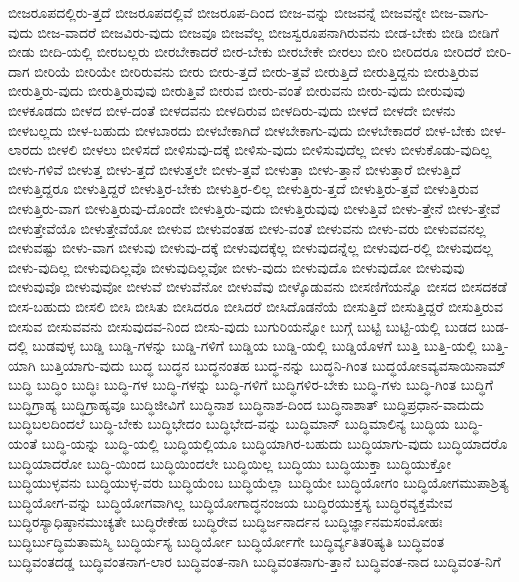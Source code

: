 {ಬೀಜರೂಪದಲ್ಲಿರು-ತ್ತದೆ
ಬೀಜರೂಪದಲ್ಲಿವೆ
ಬೀಜರೂಪ-ದಿಂದ
ಬೀಜ-ವನ್ನು
ಬೀಜವನ್ನೆ
ಬೀಜವನ್ನೇ
ಬೀಜ-ವಾಗು-ವುದು
ಬೀಜ-ವಾದರೆ
ಬೀಜವಿರು-ವುದು
ಬೀಜವೂ
ಬೀಜವೆಲ್ಲ
ಬೀಜಸ್ವರೂಪನಾಗಿರುವನು
ಬೀಡ-ಬೇಕು
ಬೀಡಿ
ಬೀಡಿಗೆ
ಬೀಡು
ಬೀದಿ-ಯಲ್ಲಿ
ಬೀರಬಲ್ಲರು
ಬೀರಬೇಕಾದರೆ
ಬೀರ-ಬೇಕು
ಬೀರಬೇಕೇ
ಬೀರಲು
ಬೀರಿ
ಬೀರಿದರೂ
ಬೀರಿದರೆ
ಬೀರಿ-ದಾಗ
ಬೀರಿಯೆ
ಬೀರಿಯೇ
ಬೀರಿರುವನು
ಬೀರು
ಬೀರು-ತ್ತದೆ
ಬೀರು-ತ್ತವೆ
ಬೀರುತ್ತಿದೆ
ಬೀರುತ್ತಿದ್ದನು
ಬೀರುತ್ತಿರುವ
ಬೀರುತ್ತಿರು-ವುದು
ಬೀರುತ್ತಿರುವುವು
ಬೀರುತ್ತಿವೆ
ಬೀರುವ
ಬೀರು-ವಂತೆ
ಬೀರುವನು
ಬೀರು-ವುದು
ಬೀರುವುವು
ಬೀಳಕೂಡದು
ಬೀಳದ
ಬೀಳ-ದಂತೆ
ಬೀಳದವನು
ಬೀಳದಿರುವ
ಬೀಳದಿರು-ವುದು
ಬೀಳದೆ
ಬೀಳದೇ
ಬೀಳನು
ಬೀಳಬಲ್ಲದು
ಬೀಳ-ಬಹುದು
ಬೀಳಬಾರದು
ಬೀಳಬೇಕಾಗಿದೆ
ಬೀಳಬೇಕಾಗು-ವುದು
ಬೀಳಬೇಕಾದರೆ
ಬೀಳ-ಬೇಕು
ಬೀಳ-ಲಾರದು
ಬೀಳಲಿ
ಬೀಳಲು
ಬೀಳಿಸದೆ
ಬೀಳಿಸುವು-ದಕ್ಕೆ
ಬೀಳಿಸು-ವುದು
ಬೀಳಿಸುವುದೆಲ್ಲ
ಬೀಳು
ಬೀಳುಕೊಡು-ವುದಿಲ್ಲ
ಬೀಳು-ಗಳಿವೆ
ಬೀಳುತ್ತ
ಬೀಳು-ತ್ತದೆ
ಬೀಳುತ್ತಲೇ
ಬೀಳು-ತ್ತವೆ
ಬೀಳುತ್ತಾ
ಬೀಳು-ತ್ತಾನೆ
ಬೀಳುತ್ತಾರೆ
ಬೀಳುತ್ತಿದೆ
ಬೀಳುತ್ತಿದ್ದರೂ
ಬೀಳುತ್ತಿದ್ದರೆ
ಬೀಳುತ್ತಿರ-ಬೇಕು
ಬೀಳುತ್ತಿರ-ಲಿಲ್ಲ
ಬೀಳುತ್ತಿರು-ತ್ತದೆ
ಬೀಳುತ್ತಿರು-ತ್ತವೆ
ಬೀಳುತ್ತಿರುವ
ಬೀಳುತ್ತಿರು-ವಾಗ
ಬೀಳುತ್ತಿರುವು-ದೊಂದೇ
ಬೀಳುತ್ತಿರು-ವುದು
ಬೀಳುತ್ತಿರುವುವು
ಬೀಳುತ್ತಿವೆ
ಬೀಳು-ತ್ತೇನೆ
ಬೀಳು-ತ್ತೇವೆ
ಬೀಳುತ್ತೇವೆಯೊ
ಬೀಳುತ್ತೇವೆಯೋ
ಬೀಳುವ
ಬೀಳುವಂತಹ
ಬೀಳು-ವಂತೆ
ಬೀಳುವನು
ಬೀಳು-ವರು
ಬೀಳುವವನಲ್ಲ
ಬೀಳುವಷ್ಟು
ಬೀಳು-ವಾಗ
ಬೀಳುವು
ಬೀಳುವು-ದಕ್ಕೆ
ಬೀಳುವುದಕ್ಕೆಲ್ಲ
ಬೀಳುವುದನ್ನೆಲ್ಲ
ಬೀಳುವುದ-ರಲ್ಲಿ
ಬೀಳುವುದಲ್ಲ
ಬೀಳು-ವುದಿಲ್ಲ
ಬೀಳುವುದಿಲ್ಲವೊ
ಬೀಳುವುದಿಲ್ಲವೋ
ಬೀಳು-ವುದು
ಬೀಳುವುದೊ
ಬೀಳುವುದೋ
ಬೀಳುವುವು
ಬೀಳುವುವೊ
ಬೀಳುವುವೋ
ಬೀಳುವೆ
ಬೀಳುವೆನೋ
ಬೀಳುವೆವು
ಬೀಳ್ಕೊಡುವನು
ಬೀಸಣಿಗೆಯನ್ನೊ
ಬೀಸದ
ಬೀಸದಕಡೆ
ಬೀಸ-ಬಹುದು
ಬೀಸಲಿ
ಬೀಸಿ
ಬೀಸಿತು
ಬೀಸಿದರೂ
ಬೀಸಿದರೆ
ಬೀಸಿದೊಡನೆಯೆ
ಬೀಸುತ್ತಿದೆ
ಬೀಸುತ್ತಿದ್ದರೆ
ಬೀಸುತ್ತಿರುವ
ಬೀಸುವ
ಬೀಸುವವನು
ಬೀಸುವುದವ-ನಿಂದ
ಬೀಸು-ವುದು
ಬುಗುರಿಯನ್ನೋ
ಬುಗ್ಗೆ
ಬುಟ್ಟಿ
ಬುಟ್ಟಿ-ಯಲ್ಲಿ
ಬುಡದ
ಬುಡ-ದಲ್ಲಿ
ಬುಡವುಳ್ಳ
ಬುಡ್ಡಿ
ಬುಡ್ಡಿ-ಗಳನ್ನು
ಬುಡ್ಡಿ-ಗಳಿಗೆ
ಬುಡ್ಡಿಯ
ಬುಡ್ಡಿ-ಯಲ್ಲಿ
ಬುಡ್ಡಿಯೊಳಗೆ
ಬುತ್ತಿ
ಬುತ್ತಿ-ಯಲ್ಲಿ
ಬುತ್ತಿ-ಯಾಗಿ
ಬುತ್ತಿಯಾಗು-ವುದು
ಬುದ್ಧ
ಬುದ್ಧನ
ಬುದ್ಧನಂತಹ
ಬುದ್ಧ-ನನ್ನು
ಬುದ್ಧನಿ-ಗಿಂತ
ಬುದ್ಧಯೋಽವ್ಯವಸಾಯಿನಾಮ್
ಬುದ್ಧಿ
ಬುದ್ಧಿಂ
ಬುದ್ಧಿಃ
ಬುದ್ಧಿ-ಗಳ
ಬುದ್ಧಿ-ಗಳನ್ನು
ಬುದ್ಧಿ-ಗಳಿಗೆ
ಬುದ್ಧಿಗಳಿರ-ಬೇಕು
ಬುದ್ಧಿ-ಗಳು
ಬುದ್ಧಿ-ಗಿಂತ
ಬುದ್ಧಿಗೆ
ಬುದ್ಧಿಗ್ರಾಹ್ಯ
ಬುದ್ಧಿಗ್ರಾಹ್ಯವೂ
ಬುದ್ಧಿಜೀವಿಗೆ
ಬುದ್ಧಿನಾಶ
ಬುದ್ಧಿನಾಶ-ದಿಂದ
ಬುದ್ಧಿನಾಶಾತ್
ಬುದ್ಧಿಪ್ರಧಾನ-ವಾದುದು
ಬುದ್ಧಿಬಲದಿಂದಲೆ
ಬುದ್ಧಿ-ಬೇಕು
ಬುದ್ಧಿಭೇದಂ
ಬುದ್ಧಿಭೇದ-ವನ್ನು
ಬುದ್ಧಿಮಾನ್
ಬುದ್ಧಿಮಾಲಿನ್ಯ
ಬುದ್ಧಿಯ
ಬುದ್ಧಿ-ಯಂತೆ
ಬುದ್ಧಿ-ಯನ್ನು
ಬುದ್ಧಿ-ಯಲ್ಲಿ
ಬುದ್ಧಿಯಲ್ಲಿಯೂ
ಬುದ್ಧಿಯಾಗಿರ-ಬಹುದು
ಬುದ್ಧಿಯಾಗು-ವುದು
ಬುದ್ಧಿಯಾದರೊ
ಬುದ್ಧಿಯಾದರೋ
ಬುದ್ಧಿ-ಯಿಂದ
ಬುದ್ಧಿಯಿಂದಲೇ
ಬುದ್ಧಿಯಿಲ್ಲ
ಬುದ್ಧಿಯು
ಬುದ್ಧಿಯುಕ್ತಾ
ಬುದ್ಧಿಯುಕ್ತೋ
ಬುದ್ಧಿಯುಳ್ಳವನು
ಬುದ್ಧಿಯುಳ್ಳ-ವರು
ಬುದ್ಧಿಯೆಂಬ
ಬುದ್ಧಿಯೆಲ್ಲಾ
ಬುದ್ಧಿಯೇ
ಬುದ್ಧಿಯೋಗಂ
ಬುದ್ಧಿಯೋಗಮುಪಾಶ್ರಿತ್ಯ
ಬುದ್ಧಿಯೋಗ-ವನ್ನು
ಬುದ್ಧಿಯೋಗವಾಗಿಲ್ಲ
ಬುದ್ಧಿಯೋಗಾದ್ಧನಂಜಯ
ಬುದ್ಧಿರಯುಕ್ತಸ್ಯ
ಬುದ್ಧಿರವ್ಯಕ್ತಮೇವ
ಬುದ್ಧಿರಸ್ಯಾಧಿಷ್ಠಾನಮುಚ್ಯತೇ
ಬುದ್ಧಿರೇಕೇಹ
ಬುದ್ಧಿರೇವ
ಬುದ್ಧಿರ್ಜನಾರ್ದನ
ಬುದ್ಧಿರ್ಜ್ಞಾನಮಸಂಮೋಹಃ
ಬುದ್ಧಿರ್ಬುದ್ಧಿಮತಾಮಸ್ಮಿ
ಬುದ್ಧಿರ್ಯಸ್ಯ
ಬುದ್ಧಿರ್ಯೋ
ಬುದ್ಧಿರ್ಯೋಗೇ
ಬುದ್ಧಿರ್ವ್ಯತಿತರಿಷ್ಯತಿ
ಬುದ್ಧಿವಂತ
ಬುದ್ಧಿವಂತದಡ್ಡ
ಬುದ್ಧಿವಂತನಾಗ-ಲಾರ
ಬುದ್ಧಿವಂತ-ನಾಗಿ
ಬುದ್ಧಿವಂತನಾಗು-ತ್ತಾನೆ
ಬುದ್ಧಿವಂತ-ನಾದ
ಬುದ್ಧಿವಂತ-ನಿಗೆ
}
